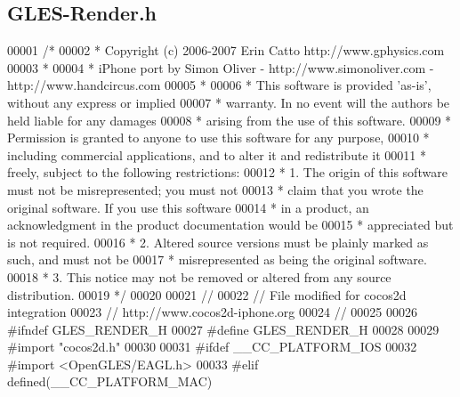 \hypertarget{_g_l_e_s-_render_8h}{\subsection{G\-L\-E\-S-\/\-Render.h}
\label{dc/d04/_g_l_e_s-_render_8h}
}

\begin{DoxyCode}
00001 \textcolor{comment}{/*}
00002 \textcolor{comment}{* Copyright (c) 2006-2007 Erin Catto http://www.gphysics.com}
00003 \textcolor{comment}{*}
00004 \textcolor{comment}{* iPhone port by Simon Oliver - http://www.simonoliver.com - http://www.handcircus.com}
00005 \textcolor{comment}{* }
00006 \textcolor{comment}{* This software is provided 'as-is', without any express or implied}
00007 \textcolor{comment}{* warranty.  In no event will the authors be held liable for any damages}
00008 \textcolor{comment}{* arising from the use of this software.}
00009 \textcolor{comment}{* Permission is granted to anyone to use this software for any purpose,}
00010 \textcolor{comment}{* including commercial applications, and to alter it and redistribute it}
00011 \textcolor{comment}{* freely, subject to the following restrictions:}
00012 \textcolor{comment}{* 1. The origin of this software must not be misrepresented; you must not}
00013 \textcolor{comment}{* claim that you wrote the original software. If you use this software}
00014 \textcolor{comment}{* in a product, an acknowledgment in the product documentation would be}
00015 \textcolor{comment}{* appreciated but is not required.}
00016 \textcolor{comment}{* 2. Altered source versions must be plainly marked as such, and must not be}
00017 \textcolor{comment}{* misrepresented as being the original software.}
00018 \textcolor{comment}{* 3. This notice may not be removed or altered from any source distribution.}
00019 \textcolor{comment}{*/}
00020 
00021 \textcolor{comment}{//}
00022 \textcolor{comment}{// File modified for cocos2d integration}
00023 \textcolor{comment}{// http://www.cocos2d-iphone.org}
00024 \textcolor{comment}{//}
00025 
00026 \textcolor{preprocessor}{#ifndef GLES\_RENDER\_H}
00027 \textcolor{preprocessor}{}\textcolor{preprocessor}{#define GLES\_RENDER\_H}
00028 \textcolor{preprocessor}{}
00029 \textcolor{preprocessor}{#import "cocos2d.h"}
00030 
00031 \textcolor{preprocessor}{#ifdef \_\_CC\_PLATFORM\_IOS}
00032 \textcolor{preprocessor}{}\textcolor{preprocessor}{#import <OpenGLES/EAGL.h>}
00033 \textcolor{preprocessor}{#elif defined(\_\_CC\_PLATFORM\_MAC)}

\end{DoxyCode}
